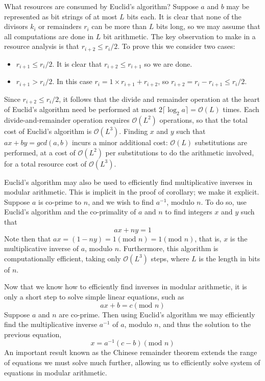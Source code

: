 What resources are consumed by Euclid's algorithm? Suppose $a$ and $b$ may be represented as bit strings of at most $L$ bits each. It is clear that none of the divisors $k_i$ or remainders $r_i$ can be more than $L$ bits long, so we may assume that all computations are done in $L$ bit arithmetic. The key observation to make in a resource analysis is that $r_{i+2} \leq r_i/2$. To prove this we consider two cases:
\begin{itemize}
    \item $r_{i+1} \leq r_{i}/2$. It is clear that $r_{i+2}\leq r_{i+1}$ so we are done.
    \item $r_{i+1} > r_i/2$. In this case $r_i=1 \times r_{i+1} + r_{i+2}$, so $r_{i+2} = r_i - r_{i+1} \leq r_i/2$.
\end{itemize}
Since $r_{i+2} \leq r_i/2$, it follows that the divide and remainder operation at the heart of Euclid's algorithm need be performed at most $2\lceil \log_2 a\rceil = \mathcal{O}(L)$ times. Each divide-and-remainder operation requires $\mathcal{O}(L^2)$ operations, so that the total cost of Euclid's algorithm is $\mathcal{O}(L^3)$. Finding $x$ and $y$ such that $ax+by = gcd(a,b)$ incurs a minor additional cost: $\mathcal{O}(L)$ substitutions are performed, at a cost of $\mathcal{O}(L^2)$ per substitutions to do the arithmetic involved, for a total resource cost of $\mathcal{O}(L^3)$.

Euclid's algorithm may also be used to efficiently find multiplicative inverses in modular arithmetic. This is implicit in the proof of corollary; we make it explicit. Suppose $a$ is co-prime to $n$, and we wish to find $a^{-1}$, modulo $n$. To do so, use Euclid's algorithm and the co-primality of $a$ and $n$ to find integers $x$ and $y$ such that
\[
ax+ny=1
\]
Note then that $ax = (1-ny) = 1 (\text{mod }n) =1 (\text{mod } n)$, that is, $x$ is the multiplicative inverse of $a$, modulo $n$. Furthermore, this algorithm is computationally efficient, taking only $\mathcal{O}(L^3)$ steps, where $L$ is the length in bits of $n$.

Now that we know how to efficiently find inverses in modular arithmetic, it is only a short step to solve simple linear equations, such as
\[
ax+b = c (\text{mod } n)
\]
Suppose $a$ and $n$ are co-prime. Then using Euclid's algorithm we may efficiently find the multiplicative inverse $a^{-1}$ of $a$, modulo $n$, and thus the solution to the previous equation,
\[
x=a^{-1}(c-b) (\text{mod } n)
\]
An important result known as the Chinese remainder theorem extends the range of equations we must solve much further, allowing us to efficiently solve system of equations in modular arithmetic.

